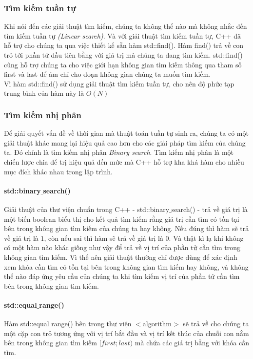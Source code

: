 \documentclass{article}
\begin{document}
\subsubsection{Tìm kiếm tuần tự}
Khi nói đến các giải thuật tìm kiếm, chúng ta không thể nào mà không nhắc đến tìm kiếm tuần tự \textit{(Linear search)}. Và với giải thuật tìm kiếm tuần tự, C++ đã hỗ trợ cho chúng ta qua việc thiết kế sẵn hàm std::find(). Hàm find() trả về con trỏ tới phần tử đầu tiên bằng với giá trị mà chúng ta đang tìm kiếm. std::find() cũng hỗ trợ chúng ta cho việc giới hạn không gian tìm kiếm thông qua tham số first và last để ám chỉ cho đoạn không gian chúng ta muốn tìm kiếm.\\

Vì hàm std::find() sử dụng giải thuật tìm kiếm tuần tự, cho nên độ phức tạp trung bình của hàm này là $O(N)$
\subsubsection{Tìm kiếm nhị phân}
Để giải quyết vấn đề về thời gian mà thuật toán tuần tự sinh ra, chúng ta có một giải thuật khác mang lại hiệu quả cao hơn cho các giải pháp tìm kiếm của chúng ta. Đó chính là tìm kiếm nhị phân \textit{Binary search}. Tìm kiếm nhị phân là một chiến lược chia để trị hiệu quả đến mức mà C++ hỗ trợ kha khá hàm cho nhiều mục đích khác nhau trong lập trình.\\
\paragraph{std::binary$\_$search()}
Giải thuật của thư viện chuẩn trong C++ - std::binary$\_$search() - trả về giá trị là một biến boolean biểu thị cho kết quả tìm kiếm rằng giá trị cần tìm có tồn tại bên trong không gian tìm kiếm của chúng ta hay không. Nếu đúng thì hàm sẽ trả về giá trị là $1$, còn nếu sai thì hàm sẽ trả về giá trị là $0$. Và thật kì lạ khi không có một hàm nào khác giống như vậy để trả về vị trí của phần tử cần tìm trong không gian tìm kiếm. Vì thế nên giải thuật thường chỉ được dùng để xác định xem khóa cần tìm có tồn tại bên trong không gian tìm kiếm hay không, và không thể nào đáp ứng yêu cầu của chúng ta khi tìm kiếm vị trí của phần tử cần tìm bên trong không gian tìm kiếm.\\
\paragraph{std::equal$\_$range()}
Hàm std::equal$\_$range() bên trong thư viện $<$algorithm$>$ sẽ trả về cho chúng ta một cặp con trỏ tương ứng với vị trí bắt đầu và vị trí kết thúc của chuỗi con nằm bên trong không gian tìm kiếm $[first; last)$ mà chứa các giá trị bằng với khóa cần tìm.\\
\end{document}
